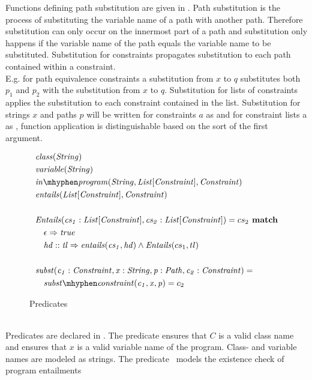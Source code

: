 Functions defining path substitution are given in .
Path substitution is the process of substituting the variable name of a path
with another path.
Therefore substitution can only occur on the innermost part of a path and
substitution only happens if the variable name of the path equals the variable name to be substituted.
Substitution for constraints propagates substitution to each path contained within a constraint.\\
E.g. for path equivalence constraints  a substitution from $x$ to $q$
substitutes both $p_1$ and $p_2$ with the substitution from $x$ to $q$.
Substitution for lists of constraints applies the substitution
to each constraint contained in the list.
Substitution for strings $x$ and paths $p$ will be written
for constraints $a$ as  and
for constraint lists \ovl a as ,
function application is distinguishable based on the sort of the first argument.
\begin{figure}[h]
\centering
\begin{align*}
&\mathit{class}(\mathit{String}) \\
&\mathit{variable}(\mathit{String})\\
&\inprog(\mathit{String},\mathit{List[Constraint]}, \mathit{Constraint}) \\
&\mathit{entails}(\mathit{List[Constraint]}, \mathit{Constraint})\\\\
&\mathit{Entails(cs_1: List[Constraint], cs_2: List[Constraint])} = cs_2 \match\\
&\quad \case{\epsilon}{true}\\
&\quad \case{hd :: tl}{\mIt{entails}(cs_1, hd)} \land \mIt{Entails}(cs_1, tl)\\\\
&\mathit{subst(c_1: Constraint, x: String, p: Path, c_2: Constraint)} = \\
&\quad\substconstr{c_1}{x}{p} = c_2
\end{align*}
\caption{Predicates}
\label{subfig:axioms-naive-general-predicates}
\end{figure}\\
Predicates are declared in .
The predicate  ensures that $C$ is a valid class name
and  ensures that $x$ is a valid variable name
of the program.
Class- and variable names are modeled as strings.
The predicate \inprog\ models the existence check of program entailments
